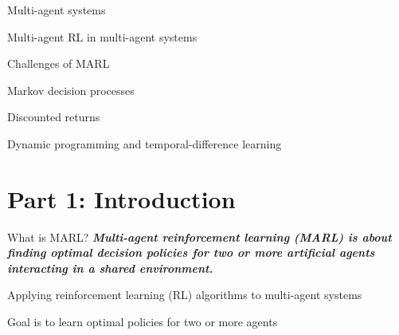 

\leoslide

\subtitle{Introduction}


\maketitle

\introslide

\begin{frame}{\outline}
    \vspace{10pt}
    \vspace{5pt}
    \blist
        \item Multi-agent systems
        \item Multi-agent RL in multi-agent systems
        \item Challenges of MARL   
    \elist
    \vspace{10pt}
    \vspace{5pt}
    \blist
        \item Markov decision processes
        \item Discounted returns
        \item Dynamic programming and temporal-difference learning
    \elist
\end{frame}

\section{Part 1: Introduction}

\begin{frame}{What is MARL?}
		\textbf{\textit{Multi-agent reinforcement learning (MARL) is about finding optimal decision policies for two or more artificial agents interacting in a shared environment.}}
  \vspace{20pt}
  \blist
    \item Applying reinforcement learning (RL) algorithms to multi-agent systems
    \item Goal is to learn optimal policies for two or more agents
  \elist
\end{frame}

